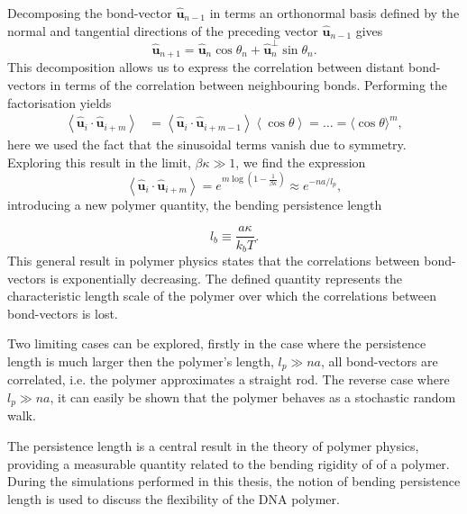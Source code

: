 Decomposing the bond-vector $\boldsymbol{\hat{u}}_{n-1}$ in terms an orthonormal basis
defined by the normal and tangential directions of the preceding vector
$\boldsymbol{\hat{u}}_{n-1}$ gives
\begin{equation}
\boldsymbol{\hat{u}}_{n+1} = \boldsymbol{\hat{u}}_{n} \cos \theta_{n} +
\boldsymbol{\hat{u}}_{n}^{\perp} \sin \theta_{n}.
\end{equation}
This decomposition allows us to express the correlation between distant bond-vectors in
terms of the correlation between neighbouring bonds. Performing the factorisation yields
\begin{equation}
\begin{aligned}
    \left\langle\boldsymbol{\hat{u}}_{i} \cdot \boldsymbol{\hat{u}}_{i+m}\right\rangle
    &=\left\langle\boldsymbol{\hat{u}}_{i} \cdot
        \boldsymbol{\hat{u}}_{i+m-1}\right\rangle\left\langle\cos
    \theta\right\rangle = \dots =\langle\cos \theta\rangle^{m},
\end{aligned}
\end{equation}
here we used the fact that the sinusoidal terms vanish due to symmetry.
Exploring this result in the limit, $\beta \kappa \gg 1$, we find the expression
\begin{equation}
    \left\langle\boldsymbol{\hat{u}}_{i} \cdot \boldsymbol{\hat{u}}_{i+m}\right\rangle =
    e^{m \log(1 - \frac{1}{\beta \kappa})} \approx e^{-na/l_p},
\end{equation}
introducing a new polymer quantity, the bending persistence length

\begin{equation}
    l_b \equiv \frac{a \kappa}{k_{b} T}.
\end{equation}
This general result in polymer physics states that the correlations between bond-vectors
is exponentially decreasing. The defined quantity represents the characteristic
length scale of the polymer over which the correlations between
bond-vectors is lost.

Two limiting cases can be explored, firstly in the
case where the persistence length is much larger then the polymer's length, $l_p \gg na$,
all bond-vectors are correlated, i.e. the polymer approximates a straight rod. The
reverse case where $l_p \gg na$, it can easily be shown that the polymer behaves as a
stochastic random walk.

The persistence length is a central result in the theory of polymer physics, providing a
measurable quantity related to the bending rigidity of of a polymer. During the
simulations performed in this thesis, the notion of bending persistence length is used to
discuss the flexibility of the DNA polymer.


